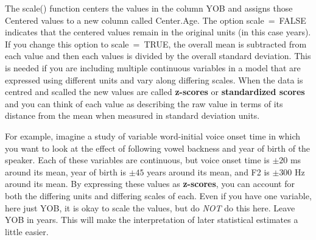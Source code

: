 \documentclass[
  12pt,
  letterpaper]{article}
\newenvironment{Shaded}{\begin{snugshade}}{\end{snugshade}}
\newcommand{\AttributeTok}[1]{\textcolor[rgb]{0.40,0.45,0.13}{#1}}
\newcommand{\CommentTok}[1]{\textcolor[rgb]{0.37,0.37,0.37}{#1}}
\newcommand{\ConstantTok}[1]{\textcolor[rgb]{0.56,0.35,0.01}{#1}}
\newcommand{\FunctionTok}[1]{\textcolor[rgb]{0.28,0.35,0.67}{#1}}
\newcommand{\NormalTok}[1]{\textcolor[rgb]{0.00,0.23,0.31}{#1}}
\newcommand{\OtherTok}[1]{\textcolor[rgb]{0.00,0.23,0.31}{#1}}
\newcommand{\SpecialCharTok}[1]{\textcolor[rgb]{0.37,0.37,0.37}{#1}}
\renewcommand\texttt[1]{{\ttfamily\color{BrickRed}#1}}
\begin{document}
\begin{Shaded}
\end{Shaded}

\begin{Shaded}
\end{Shaded}

The \texttt{scale()} function centers the values in the column
\texttt{YOB} and assigns those Centered values to a new column called
\texttt{Center.Age}. The option \texttt{scale\ =\ FALSE} indicates that
the centered values remain in the original units (in this case years).
If you change this option to \texttt{scale\ =\ TRUE}, the overall mean
is subtracted from each value and then each values is divided by the
overall standard deviation. This is needed if you are including multiple
continuous variables in a model that are expressed using different units
and vary along differing scales. When the data is centred and scalled
the new values are called \textbf{z-scores} or \textbf{standardized
scores} and you can think of each value as describing the raw value in
terms of its distance from the mean when measured in standard deviation
units.

For example, imagine a study of variable word-initial voice onset time
in which you want to look at the effect of following vowel backness and
year of birth of the speaker. Each of these variables are continuous,
but voice onset time is \(\pm20\) ms around its mean, year of birth is
\(\pm45\) years around its mean, and F2 is \(\pm300\) Hz around its
mean. By expressing these values as \textbf{z-scores}, you can account
for both the differing units and differing scales of each. Even if you
have one variable, here just \texttt{YOB}, it is okay to scale the
values, but do \emph{NOT} do this here. Leave \texttt{YOB} in years.
This will make the interpretation of later statistical estimates a
little easier.
\end{document}
